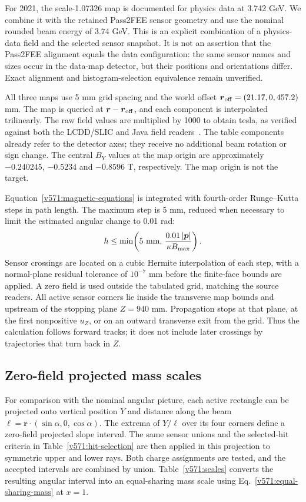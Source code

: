 For 2021, the scale-1.07326 map is documented for physics data at 3.742 GeV.
We combine it with the retained Pass2FEE sensor geometry and use the nominal
rounded beam energy of 3.74 GeV. This is an explicit combination of a
physics-data field and the selected sensor snapshot. It is not an assertion
that the Pass2FEE alignment equals the data configuration: the same sensor
names and sizes occur in the data-map detector, but their positions and
orientations differ. Exact alignment and histogram-selection equivalence
remain unverified.

All three maps use 5 mm grid spacing and the world offset
$\boldsymbol r_{\rm off}=(21.17,0,457.2)$ mm. The map is queried at
$\boldsymbol r-\boldsymbol r_{\rm off}$, and each component is interpolated
trilinearly. The raw field values are multiplied by 1000 to obtain tesla,
as verified against both the LCDD/SLIC and Java field readers~\cite{v571:fieldreaders}.
The table components already refer to the detector axes; they receive no
additional beam rotation or sign change. The central $B_Y$ values at the
map origin are approximately $-0.240245$, $-0.5234$ and $-0.8596$ T,
respectively. The map origin is not the target.

Equation~\eqref{v571:magnetic-equations} is integrated with fourth-order
Runge--Kutta steps in path length. The maximum step is 5 mm, reduced when
necessary to limit the estimated angular change to 0.01 rad:
\begin{equation}
 h\leq\min\!\left(5\ {\rm mm},\,
           \frac{0.01\,|\boldsymbol p|}{\kappa B_{\max}}\right).
 \label{v571:transport-step}
\end{equation}
Sensor crossings are located on a cubic Hermite interpolation of each step,
with a normal-plane residual tolerance of $10^{-7}$ mm before the finite-face
bounds are applied. A zero field is used outside the tabulated grid, matching
the source readers. All active sensor corners lie inside the transverse
map bounds and upstream of the stopping plane $Z=940$ mm. Propagation stops
at that plane, at the first nonpositive $u_Z$, or on an outward transverse
exit from the grid. Thus the calculation follows forward tracks; it does
not include later crossings by trajectories that turn back in $Z$.

\subsection{Zero-field projected mass scales}
\label{v571:projected-scales}
For comparison with the nominal angular picture, each active rectangle can
be projected onto vertical position $Y$ and distance along the beam
$\ell=\boldsymbol r\cdot(\sin\alpha,0,\cos\alpha)$.
The extrema of $Y/\ell$ over its four corners define a zero-field projected
slope interval.
The same sensor unions and the selected-hit criteria in
Table~\ref{v571:hit-selection} are then applied in this projection to
symmetric upper and lower rays. Both charge assignments are tested, and the
accepted intervals are combined by union. Table~\ref{v571:scales}
converts the resulting angular interval into an equal-sharing mass scale using
Eq.~\eqref{v571:equal-sharing-mass} at $x=1$.

